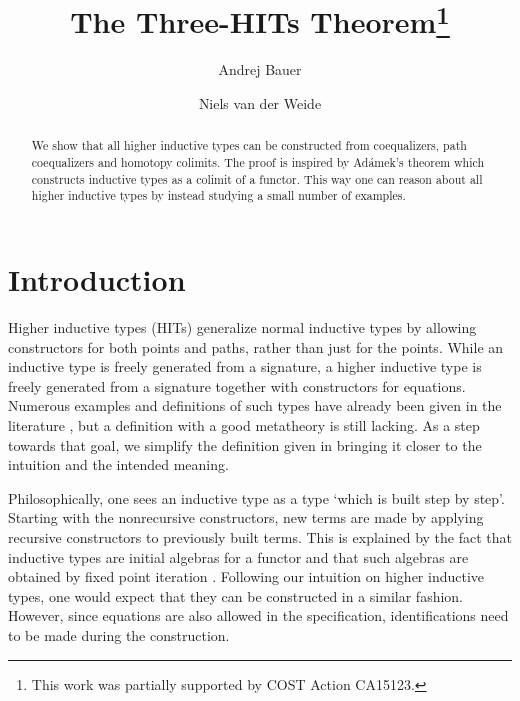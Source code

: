 \documentclass[a4paper,UKenglish]{lipics-v2016}
\title{The Three-HITs Theorem\footnote{This work was partially supported by COST Action CA15123.}}
\author[1]{Andrej Bauer}
\author[2]{Niels van der Weide}
\affil[1]{Faculty of Mathematics and Physics, University of Ljubljana, Ljubljana, Slovenia\\
  \texttt{Andrej.Bauer@andrej.com}}
\affil[2]{Department of Computer Science, Radboud University, Nijmegen, The Netherlands\\
  \texttt{nweide@cs.ru.nl}}
\begin{document}
\maketitle

\begin{abstract}
We show that all higher inductive types can be constructed from coequalizers, path coequalizers and homotopy colimits.
The proof is inspired by Ad\'amek's theorem which constructs inductive types as a colimit of a functor.
This way one can reason about all higher inductive types by instead studying a small number of examples.
 \end{abstract}

\section{Introduction}
Higher inductive types (HITs) generalize normal inductive types by allowing constructors for both points and paths, rather than just for the points.
While an inductive type is freely generated from a signature, a higher inductive type is freely generated from a signature together with constructors for equations.
Numerous examples and definitions of such types have already been given in the literature \cite{altenkirch2016quotient,awodey2012inductive,basoldhigher,sojakova2015higher,hottbook}, but a definition with a good metatheory is still lacking.
As a step towards that goal, we simplify the definition given in \cite{basoldhigher} bringing it closer to the intuition and the intended meaning.

Philosophically, one sees an inductive type as a type `which is built step by step'.
Starting with the nonrecursive constructors, new terms are made by applying recursive constructors to previously built terms.
This is explained by the fact that inductive types are initial algebras for a functor \cite{dybjer1994inductive,dybjer2003induction} and that such algebras are obtained by fixed point iteration \cite{adamek1974free}.
Following our intuition on higher inductive types, one would expect that they can be constructed in a similar fashion.
However, since equations are also allowed in the specification, identifications need to be made during the construction.
\end{document}
